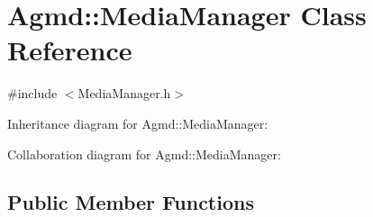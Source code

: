 \hypertarget{class_agmd_1_1_media_manager}{\section{Agmd\+:\+:Media\+Manager Class Reference}
\label{class_agmd_1_1_media_manager}
}


{\ttfamily \#include $<$Media\+Manager.\+h$>$}



Inheritance diagram for Agmd\+:\+:Media\+Manager\+:


Collaboration diagram for Agmd\+:\+:Media\+Manager\+:
\subsection*{Public Member Functions}
